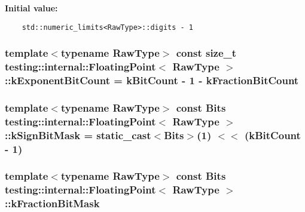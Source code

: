 \textbf{Initial value:}

\begin{Code}\begin{verbatim}
    std::numeric_limits<RawType>::digits - 1
\end{verbatim}
\end{Code}
\subsubsection{\setlength{\rightskip}{0pt plus 5cm}template$<$typename RawType$>$ const size\_\-t {\bf testing::internal::FloatingPoint}$<$ RawType $>$::{\bf kExponentBitCount} = {\bf kBitCount} - 1 - {\bf kFractionBitCount}\hspace{0.3cm}{\tt  [static]}}\label{classtesting_1_1internal_1_1FloatingPoint_5790439a5d695303b59362ba54732611}


\subsubsection{\setlength{\rightskip}{0pt plus 5cm}template$<$typename RawType$>$ const {\bf Bits} {\bf testing::internal::FloatingPoint}$<$ RawType $>$::{\bf kSignBitMask} = static\_\-cast$<${\bf Bits}$>$(1) $<$$<$ ({\bf kBitCount} - 1)\hspace{0.3cm}{\tt  [static]}}\label{classtesting_1_1internal_1_1FloatingPoint_4cdfe31dcfc38670299d0ab202d94a8d}


\subsubsection{\setlength{\rightskip}{0pt plus 5cm}template$<$typename RawType$>$ const {\bf Bits} {\bf testing::internal::FloatingPoint}$<$ RawType $>$::{\bf kFractionBitMask}\hspace{0.3cm}{\tt  [static]}}\label{classtesting_1_1internal_1_1FloatingPoint_a11b71352cfaea7de9194099116ac79a}


